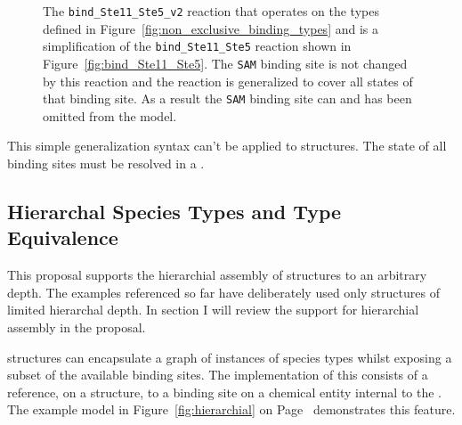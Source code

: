 \documentclass{cekarticle}
\begin{document}
\begin{figure}[h]
  \caption{
  The \texttt{bind\_Ste11\_Ste5\_v2} reaction that operates on the types defined in
  Figure~\ref{fig:non_exclusive_binding_types} and is a simplification of the \texttt{bind\_Ste11\_Ste5}
  reaction shown in Figure~\ref{fig:bind_Ste11_Ste5}. The \texttt{SAM} binding site is not changed by
  this reaction and the reaction is generalized to cover all states of that binding site.  As a result
  the
  \texttt{SAM}
  binding site
  can and
  has been omitted from the model.}
  
  \label{fig:bind_Ste11_Ste5_v2}
\end{figure}

This simple generalization syntax can't be applied to  structures. 
The state of all binding sites must be resolved in a .

\subsection{Hierarchal Species Types and Type Equivalence}

This proposal supports the hierarchial assembly of  structures to an arbitrary depth.
The examples referenced so far have deliberately used only structures of limited hierarchal depth.  In
section I will review the support for hierarchial assembly in the proposal. 

 structures can encapsulate a graph of instances of species types whilst exposing
a subset of the available binding sites.  The implementation of this consists of a reference,
on a  structure, to a binding site on a chemical entity internal to the
.  The example model in Figure~\ref{fig:hierarchial} on Page~\pageref{fig:hierarchial}
demonstrates this feature.
\end{document}
